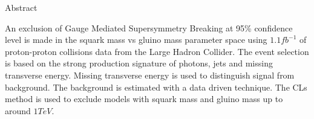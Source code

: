 {\bf \centerline{\Large Abstract}}

\vspace{1cm}

An exclusion of Gauge Mediated Supersymmetry Breaking at 95\% confidence level 
is made in the squark mass vs gluino mass parameter space using
$1.1\unit{fb^{-1}}$ of proton-proton collisions data from the Large Hadron
Collider. The event selection is based on the strong production signature of 
photons, jets and missing transverse energy. Missing transverse energy is used 
to distinguish signal from background. The background is estimated with a data 
driven technique. The CLs method is used to exclude models with squark mass and 
gluino mass up to around $1\unit{TeV}$.
